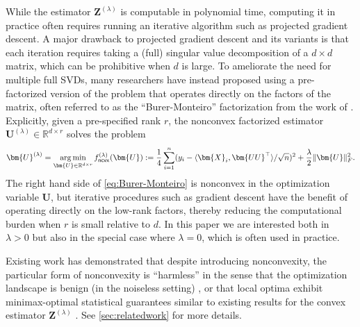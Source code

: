 \documentclass[10pt]{article}
\DeclareMathOperator*{\argmin}{arg\,min}
\renewcommand{\t}{^{\top}}
\theoremstyle{definition}
\begin{document}
While the estimator $\bm{Z}^{(\lambda)}$ is computable in polynomial time, computing it in practice often requires running an iterative algorithm such as projected gradient descent. A major drawback to projected gradient descent and its variants is that each iteration requires taking a (full) singular value decomposition of a $d\times d$ matrix, which can be prohibitive when $d$ is large. To ameliorate the need for multiple full SVDs, many researchers have instead proposed using a pre-factorized version of the problem that operates directly on the factors of the matrix, often referred to as the  ``Burer-Monteiro'' factorization from the work of \citet{burer_nonlinear_2003}.  Explicitly, given a pre-specified rank $r$, the nonconvex factorized estimator $\bm{U}^{(\lambda)} \in \mathbb{R}^{d\times r}$ solves the problem
 \begin{align}
     \bm{U}^{(\lambda)} = \argmin_{\bm{U} \in \mathbb{R}^{d\times r}} f_{{\sf ncvx}}^{(\lambda)}(\bm{U}) := \frac{1}{4} \sum_{i=1}^{n} (y_i - \langle \bm{X}_i, \bm{UU}\t \rangle/\sqrt{n} )^2 + \frac{\lambda}{2} \| \bm{U} \|_F^2.
 \label{eq:Burer-Monteiro}
 \end{align}
  The right hand side of \eqref{eq:Burer-Monteiro} is nonconvex in the optimization variable $\bm{U}$, but iterative procedures such as gradient descent have the benefit of operating directly on the low-rank factors, thereby reducing the computational burden when $r$ is small relative to $d$.  In this paper we are interested both in $\lambda > 0$ but also in the special case where $\lambda = 0$, which is often used in practice.  

 Existing work has demonstrated that despite introducing nonconvexity, the particular form of nonconvexity is ``harmless'' in the sense that the optimization landscape is benign (in the noiseless setting) \citep{haeffele2014structured,bhojanapalli_global_2016,li_symmetry_2019,ma_optimization_2023}, or that local optima exhibit minimax-optimal statistical guarantees similar to existing results for the convex estimator $\bm{Z}^{(\lambda)}$ \citep{ge_no_2017,negahban_estimation_2011,tu_low-rank_2016,zheng_convergent_2015}. See \cref{sec:relatedwork} for more details.
 
\end{document}

